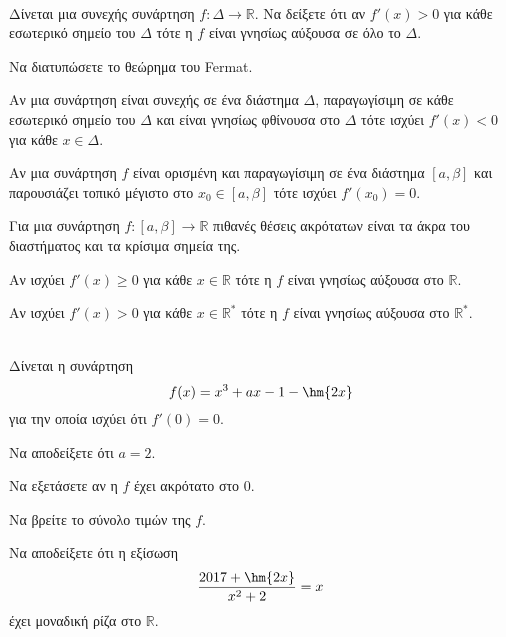 \documentclass[twoside,nofonts,internet,math,spyros]{frontisthrio-diag}
\begin{document}
\begin{thema}
\item \mbox{}\\\vspace{-5mm}
\begin{erwthma}
\item Δίνεται μια συνεχής συνάρτηση $ f:\Delta\to\mathbb{R} $. Να δείξετε ότι αν $ f'(x)>0 $ για κάθε εσωτερικό σημείο του $ \Delta $ τότε η $ f $ είναι γνησίως αύξουσα σε όλο το $ \Delta $.
\item Να διατυπώσετε το θεώρημα του Fermat.
\item \swstolathospan
\begin{alist}
\item Αν μια συνάρτηση είναι συνεχής σε ένα διάστημα $ \varDelta $, παραγωγίσιμη σε κάθε εσωτερικό σημείο του $ \varDelta $ και είναι γνησίως φθίνουσα στο $ \varDelta $ τότε ισχύει $ f'(x)<0 $ για κάθε $ x\in\varDelta $.
\item Αν μια συνάρτηση $ f $ είναι ορισμένη και παραγωγίσιμη σε ένα διάστημα $ [a,\beta] $ και παρουσιάζει τοπικό μέγιστο στο $ x_0\in[a,\beta] $ τότε ισχύει $ f'(x_0)=0 $.
\item Για μια συνάρτηση $ f:[a,\beta]\to\mathbb{R} $ πιθανές θέσεις ακρότατων είναι τα άκρα του διαστήματος και τα κρίσιμα σημεία της. 
\item Αν ισχύει $ f'(x)\geq 0 $ για κάθε $ x\in\mathbb{R} $ τότε η $ f $ είναι γνησίως αύξουσα στο $ \mathbb{R} $.
\item Αν ισχύει $ f'(x)>0 $ για κάθε $ x\in\mathbb{R}^* $ τότε η $ f $ είναι γνησίως αύξουσα στο $ \mathbb{R}^* $.
\end{alist}
\end{erwthma}
\item\mbox{}\\
Δίνεται η συνάρτηση 
\[ f(x)=x^3+ax-1-\hm{2x} \]
για την οποία ισχύει ότι $ f'(0)=0 $.
\begin{erwthma}
\item Να αποδείξετε ότι $ a=2 $.
\item Να εξετάσετε αν η $ f $ έχει ακρότατο στο $ 0 $.
\item Να βρείτε το σύνολο τιμών της $ f $.
\item Να αποδείξετε ότι η εξίσωση \[ \frac{2017+\hm{2x}}{x^2+2}=x \]
έχει μοναδική ρίζα στο $ \mathbb{R} $.
\end{erwthma}

\end{thema}
\end{document}

